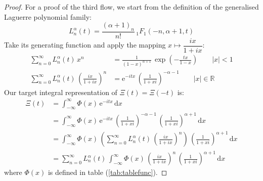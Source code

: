 \documentclass[a4paper,11pt,twoside]{amsart}
\newcommand{\verifiedeq}{=}
\newcommand{\defeq}{=}
\newcommand{\verifiedeq}{\stackrel{\checkmark}{=}}
\newcommand{\defeq}{\stackrel{\scriptscriptstyle \textnormal{def}}{=}}
\begin{document}
\begin{proof}
For a proof of the third flow, we start from the definition of the generalised Laguerre polynomial family:
\begin{equation}
 L^{\alpha}_n(t) \defeq \frac{(\alpha+1)_n}{n!}\, {}_1F_1(-n, \alpha+1,t) 
\end{equation}
Take its generating function and apply the mapping $x \mapsto \dfrac{ix}{1+ix}$:
\begin{align}
 \sum_{n=0}^\infty L^{\alpha}_n(t)\, x^n &\verifiedeq \frac{1}{(1-x)^{\alpha+1}}\,\exp\left(-\frac{tx}{1-x}\right) \qquad |x| < 1 \\
 \sum_{n=0}^\infty L^{\alpha}_n(t)\,\left(\frac{ix}{1+ix}\right)^n &\verifiedeq \textrm{e}^{-itx}\,\left(\frac{1}{1+xi} \right)^{-\alpha-1} \qquad |x| \in \mathbb{R}
\end{align}
Our target integral representation of $\Xi(t) = \Xi(-t)$ is:
\begin{align}
 \Xi(t) &\verifiedeq \int_{-\infty}^\infty \Phi(x)\,\textrm{e}^{-itx}\, \mathrm{d}x \\
 & \verifiedeq \int_{-\infty}^\infty \Phi(x)\,\textrm{e}^{-itx}\,\left(\frac{1}{1+xi} \right)^{-\alpha-1}\,\left(\frac{1}{1+xi} \right)^{\alpha+1} \, \mathrm{d}x \\
 & \verifiedeq \int_{-\infty}^\infty \Phi(x)\,\left( \sum_{n=0}^\infty L^{\alpha}_n(t)\,\left(\frac{ix}{1+ix}\right)^n\right)\,\left(\frac{1}{1+xi} \right)^{\alpha+1} \, \mathrm{d}x \\
  &\verifiedeq \sum_{n=0}^\infty L^{\alpha}_n(t)\,\int_{-\infty}^\infty \Phi(x)\,\left(\frac{ix}{1+ix}\right)^n\,\left(\frac{1}{1+xi} \right)^{\alpha+1}\, \mathrm{d}x
\end{align}
where $\Phi(x)$ is defined in table (\ref{tab:tablefunc}).
\end{proof}
\end{document}
